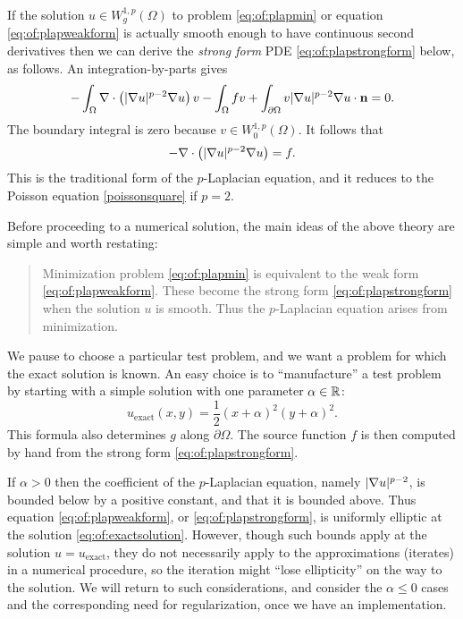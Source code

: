 If the solution $u \in W_g^{1,p}(\Omega)$ to problem \eqref{eq:of:plapmin} or equation \eqref{eq:of:plapweakform} is actually smooth enough to have continuous second derivatives then we can derive the \emph{strong form} PDE \eqref{eq:of:plapstrongform} below, as follows.  An integration-by-parts \citep[Appendix C]{Evans2010} gives
    $$-\int_\Omega \nabla\cdot\left(|\nabla u|^{p-2} \nabla u\right) v - \int_\Omega f v + \int_{\partial \Omega} v |\nabla u|^{p-2} \nabla u \cdot \mathbf{n} = 0.$$
The boundary integral is zero because $v\in W_0^{1,p}(\Omega)$.  It follows that
\begin{equation}
- \nabla\cdot\left(|\nabla u|^{p-2} \nabla u\right) = f.
\label{eq:of:plapstrongform}
\end{equation}
This is the traditional form of the $p$-Laplacian equation, and it reduces to the Poisson equation \eqref{poissonsquare} if $p=2$.

Before proceeding to a numerical solution, the main ideas of the above theory are simple and worth restating:
\begin{quote}
Minimization problem \eqref{eq:of:plapmin} is equivalent to the weak form \eqref{eq:of:plapweakform}.  These become the strong form \eqref{eq:of:plapstrongform} when the solution $u$ is smooth.  Thus the $p$-Laplacian equation arises from minimization.
\end{quote}

We pause to choose a particular test problem, and we want a problem for which the exact solution is known.  An easy choice is to ``manufacture'' a test problem by starting with a simple solution with one parameter $\alpha\in\mathbb{R}$:
\begin{equation}
    u_{\text{exact}}(x,y) = \frac{1}{2} (x+\alpha)^2 (y+\alpha)^2. \label{eq:of:exactsolution}
\end{equation}
This formula also determines $g$ along $\partial \Omega$.  The source function $f$ is then computed by hand from the strong form \eqref{eq:of:plapstrongform}.

If $\alpha>0$ then the coefficient of the $p$-Laplacian equation, namely $|\nabla u|^{p-2}$, is bounded below by a positive constant, and that it is bounded above.  Thus equation \eqref{eq:of:plapweakform}, or \eqref{eq:of:plapstrongform}, is uniformly elliptic \citep{Evans2010} at the solution \eqref{eq:of:exactsolution}.  However, though such bounds apply at the solution $u=u_{\text{exact}}$, they do not necessarily apply to the approximations (iterates) in a numerical procedure, so the iteration might ``lose ellipticity'' on the way to the solution.  We will return to such considerations, and consider the $\alpha \le 0$ cases and the corresponding need for regularization, once we have an implementation.


